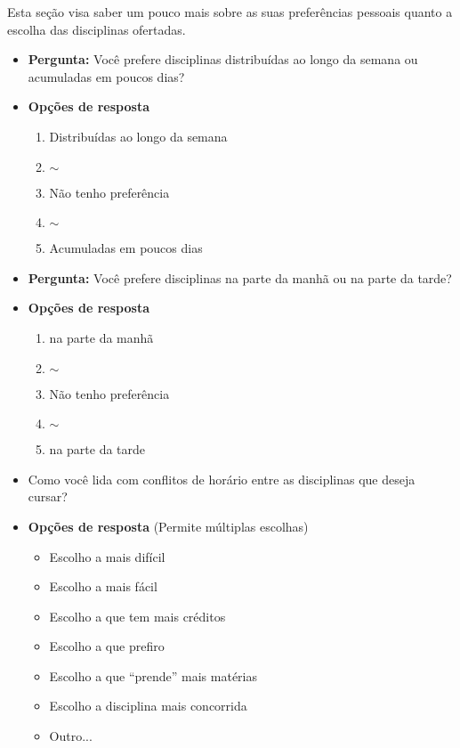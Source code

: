 \begin{apendicesenv}
  Esta seção visa saber um pouco mais sobre as suas preferências pessoais quanto a escolha das disciplinas ofertadas.

  \begin{itemize}
    \item \textbf{Pergunta:} Você prefere disciplinas distribuídas ao longo da semana ou acumuladas em poucos dias?
    \item \textbf{Opções de resposta}
          \begin{enumerate}
            \item Distribuídas ao longo da semana
            \item $\sim$
            \item Não tenho preferência
            \item $\sim$
            \item Acumuladas em poucos dias
          \end{enumerate}
  \end{itemize}

  \begin{itemize}
    \item \textbf{Pergunta:} Você prefere disciplinas na parte da manhã ou na parte da tarde?
    \item \textbf{Opções de resposta}
          \begin{enumerate}
            \item na parte da manhã
            \item $\sim$
            \item Não tenho preferência
            \item $\sim$
            \item na parte da tarde
          \end{enumerate}
  \end{itemize}

  \begin{itemize}
    \item Como você lida com conflitos de horário entre as disciplinas que deseja cursar?
    \item \textbf{Opções de resposta} (Permite múltiplas escolhas)
          \begin{itemize}
            \item Escolho a mais difícil
            \item Escolho a mais fácil
            \item Escolho a que tem mais créditos
            \item Escolho a que prefiro
            \item Escolho a que ``prende'' mais matérias
            \item Escolho a disciplina mais concorrida
            \item Outro...
          \end{itemize}
  \end{itemize}


\end{apendicesenv}
